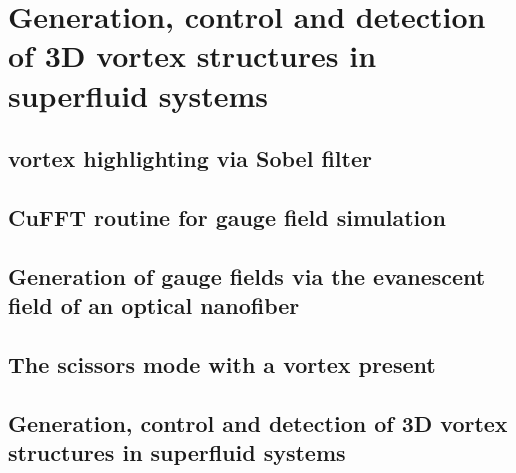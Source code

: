 \chapter{Generation, control and detection of 3D vortex structures in superfluid systems}
\label{ch-3d}

\section{vortex highlighting via Sobel filter}

\section{CuFFT routine for gauge field simulation}

\section{Generation of gauge fields via the evanescent field of an optical nanofiber}

\section{The scissors mode with a vortex present}

\section{Generation, control and detection of 3D vortex structures in superfluid
 systems}
